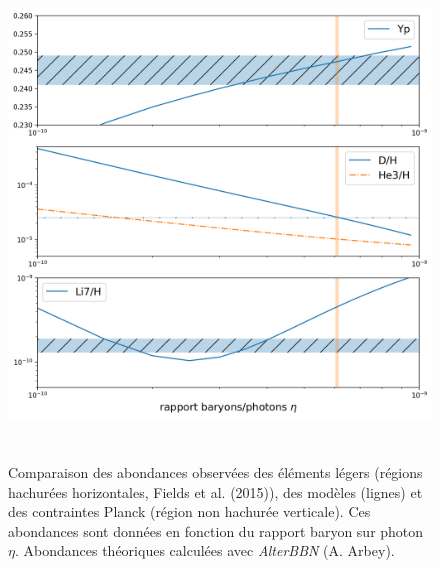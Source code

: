 \begin{figure}[htbp]
	\centering
		\includegraphics[height=13cm]{figs/BBN.png}
		\caption[Comparaison des abondances observées des éléments légers]{Comparaison des abondances observées des éléments légers (régions hachurées horizontales, Fields et al. (2015)), des modèles (lignes) et des contraintes Planck (région non hachurée verticale). Ces abondances sont données en fonction du rapport baryon sur photon  $\eta$. Abondances théoriques calculées avec \textit{AlterBBN} (A. Arbey).}
	\label{f:nucle}
\end{figure}
